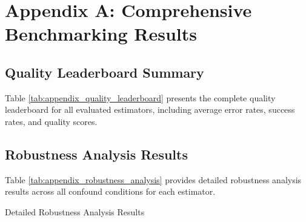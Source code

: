 \section{Appendix A: Comprehensive Benchmarking Results}

\subsection{Quality Leaderboard Summary}

Table \ref{tab:appendix_quality_leaderboard} presents the complete quality leaderboard for all evaluated estimators, including average error rates, success rates, and quality scores.

\begin{table}[h]
\centering
\caption{Complete Quality Leaderboard Summary}
\label{tab:appendix_quality_leaderboard}
\end{table}

\subsection{Robustness Analysis Results}

Table \ref{tab:appendix_robustness_analysis} provides detailed robustness analysis results across all confound conditions for each estimator.

\begin{table}[h]
\centering
\caption{Detailed Robustness Analysis Results}
\label{tab:appendix_robustness_analysis}
\end{table}

